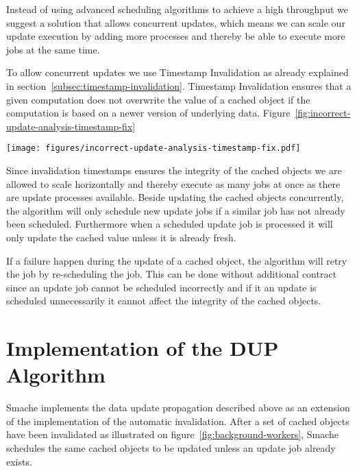 Instead of using advanced scheduling algorithms to achieve a high throughput we suggest a solution that allows concurrent updates, which means we can scale our update execution by adding more processes and thereby be able to execute more jobs at the same time.

To allow concurrent updates we use Timestamp Invalidation as already explained in section~\ref{subsec:timestamp-invalidation}. Timestamp Invalidation ensures that a given computation does not overwrite the value of a cached object if the computation is based on a newer version of underlying data. Figure~\ref{fig:incorrect-update-analysis-timestamp-fix}

\begin{figure*}[ht!]
  \centering
  \texttt{[image: figures/incorrect-update-analysis-timestamp-fix.pdf]}
  \caption{How Invalidation Timestamps fixes the concurrency problem described in figure~\ref{fig:incorrect-updates-analysis}.}
  \label{fig:incorrect-update-analysis-timestamp-fix}
\end{figure*}

Since invalidation timestamps ensures the integrity of the cached objects we are allowed to scale horizontally and thereby execute as many jobs at once as there are update processes available. Beside updating the cached objects concurrently, the algorithm will only schedule new update jobs if a similar job has not already been scheduled. Furthermore when a scheduled update job is processed it will only update the cached value unless it is already fresh.

If a failure happen during the update of a cached object, the algorithm will retry the job by re-scheduling the job. This can be done without additional contract since an update job cannot be scheduled incorrectly and if it an update is scheduled unnecessarily it cannot affect the integrity of the cached objects.


\section{Implementation of the DUP Algorithm}
\label{sec:implementing-the-data-updata-propagation-algorithm}

Smache implements the data update propagation described above as an extension of the implementation of the automatic invalidation. After a set of cached objects have been invalidated as illustrated on figure~\ref{fig:background-workers}, Smache schedules the same cached objects to be updated unless an update job already exists.

